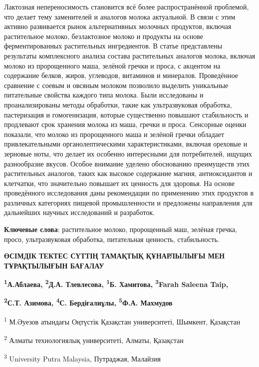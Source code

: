 Лактозная непереносимость становится всё более распространённой
проблемой, что делает тему заменителей и аналогов молока актуальной. В
связи с этим активно развивается рынок альтернативных молочных
продуктов, включая растительное молоко, безлактозное молоко и продукты
на основе ферментированных растительных ингредиентов. В статье
представлены результаты комплексного анализа состава растительных
аналогов молока, включая молоко из пророщенного маша, зелёной гречки и
проса, с акцентом на содержание белков, жиров, углеводов, витаминов и
минералов. Проведённое сравнение с соевым и овсяным молоком позволило
выделить уникальные питательные свойства каждого типа молока. Были
исследованы и проанализированы методы обработки, такие как
ультразвуковая обработка, пастеризация и гомогенизация, которые
существенно повышают стабильность и продлевают срок хранения молока из
маша, гречки и проса. Сенсорные оценки показали, что молоко из
пророщенного маша и зелёной гречки обладает привлекательными
органолептическими характеристиками, включая ореховые и зерновые ноты,
что делает их особенно интересными для потребителей, ищущих разнообразие
вкусов. Особое внимание уделено обоснованию преимуществ этих
растительных аналогов, таких как высокое содержание магния,
антиоксидантов и клетчатки, что значительно повышает их ценность для
здоровья. На основе проведённого исследования даны рекомендации по
применению этих продуктов в различных категориях пищевой промышленности
и предложены направления для дальнейших научных исследований и
разработок.

{\bfseries Ключевые слова}: растительное молоко, пророщенный маш, зелёная
гречка, просо, ультразвуковая обработка, питательная ценность,
стабильность.

{\bfseries ӨСІМДІК ТЕКТЕС СҮТТІҢ ТАМАҚТЫҚ ҚҰНАРЛЫЛЫҒЫ МЕН ТҰРАҚТЫЛЫҒЫН
БАҒАЛАУ}

{\bfseries \textsuperscript{1}А.Аблаева\textsuperscript{\envelope },
\textsuperscript{2}Д.А. Тлевлесова, \textsuperscript{1}Б. Хамитова,
\textsuperscript{3}Farah Saleena Taip,}

{\bfseries \textsuperscript{2}С.Т. Азимова, \textsuperscript{4}С.
Бердіғалиұлы, \textsuperscript{5}Ф.А. Махмудов}

\textsuperscript{1} М.Әуезов атындағы Оңтүстік Қазақстан университеті,
Шымкент, Қазақстан

\textsuperscript{2} Алматы технологиялық университеті, Алматы, Қазақстан

\textsuperscript{3} University Putra Malaysia, Путраджая, Малайзия

